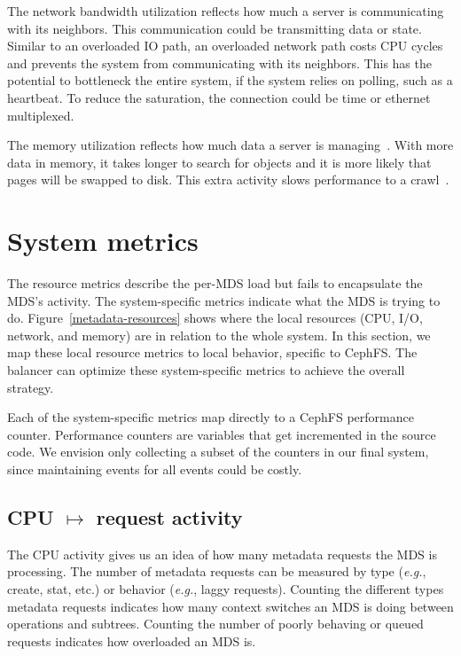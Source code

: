 The network bandwidth utilization reflects how much a server is communicating with its neighbors. This communication could be transmitting data or state. Similar to an overloaded IO path, an overloaded network path costs CPU cycles and prevents the system from communicating with its neighbors. This has the potential to bottleneck the entire system, if the system relies on polling, such as a heartbeat. To reduce the saturation, the connection could be time or ethernet multiplexed. 

The memory utilization reflects how much data a server is managing~\cite{thusoo:sigmod2010-facebook-infrastructure}. With more data in memory, it takes longer to search for objects and it is more likely that pages will be swapped to disk. This extra activity slows performance to a crawl~\cite{wulf:sigarch1995-memory-wall}. 


\section{System metrics}
The resource metrics describe the per-MDS load but fails to encapsulate the MDS's activity. The system-specific metrics indicate what the MDS is trying to do. Figure~\ref{metadata-resources} shows where the local resources (CPU, I/O, network, and memory) are in relation to the whole system. In this section, we map these local resource metrics to local behavior, specific to CephFS. The balancer can optimize these system-specific metrics to achieve the overall strategy.

Each of the system-specific metrics map directly to a CephFS performance counter. Performance counters are variables that get incremented in the source code. We envision only collecting a subset of the counters in our final system, since maintaining events for all events could be costly. 

\subsection*{CPU \(\mapsto\) request activity}
The CPU activity gives us an idea of how many metadata requests the MDS is processing. The number of metadata requests can be measured by type ({\it e.g.}, create, stat, etc.) or behavior ({\it e.g.}, laggy requests). Counting the different types metadata requests indicates how many context switches an MDS is doing between operations and subtrees. Counting the number of poorly behaving or queued requests indicates how overloaded an MDS is.

